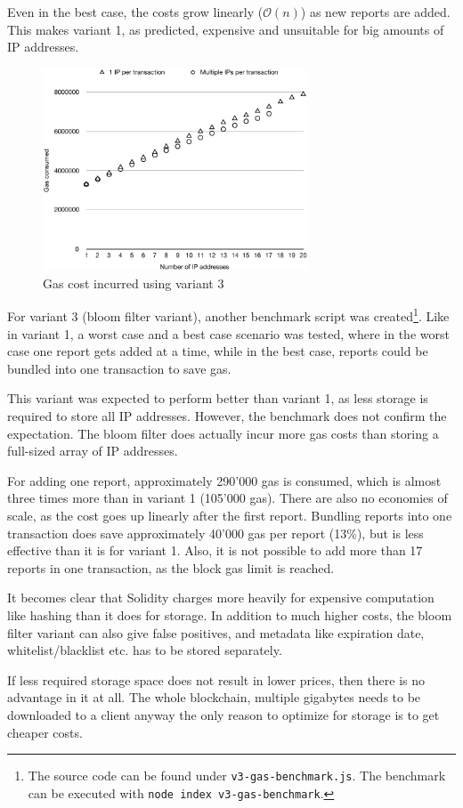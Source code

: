 Even in the best case, the costs grow linearly ($\mathcal{O}(n)$) as new reports are added. This makes variant 1, as predicted, expensive and unsuitable for big amounts of IP addresses.

\begin{figure}[H]
\centering
\includegraphics[width=0.7\textwidth]{v3-gas-cost.pdf}
\caption{Gas cost incurred using variant 3}
\label{fig:v3-gas-cost}
\end{figure}

For variant 3 (bloom filter variant), another benchmark script was created\footnote{The source code can be found under \texttt{v3-gas-benchmark.js}. The benchmark can be executed with \texttt{node index v3-gas-benchmark}.}. Like in variant 1, a worst case and a best case scenario was tested, where in the worst case one report gets added at a time, while in the best case, reports could be bundled into one transaction to save gas.

This variant was expected to perform better than variant 1, as less storage is required to store all IP addresses. However, the benchmark does not confirm the expectation. The bloom filter does actually incur more gas costs than storing a full-sized array of IP addresses. 

For adding one report, approximately 290'000 gas is consumed, which is almost three times more than in variant 1 (105'000 gas). There are also no economies of scale, as the cost goes up linearly after the first report. Bundling reports into one transaction does save approximately 40'000 gas per report (13\%), but is less effective than it is for variant 1. Also, it is not possible to add more than 17 reports in one transaction, as the block gas limit is reached.

It becomes clear that Solidity charges more heavily for expensive computation like hashing than it does for storage.
In addition to much higher costs, the bloom filter variant can also give false positives, and metadata like expiration date, whitelist/blacklist etc. has to be stored separately.

If less required storage space does not result in lower prices, then there is no advantage in it at all. The whole blockchain, multiple gigabytes needs to be downloaded to a client anyway \textemdash {} the only reason to optimize for storage is to get cheaper costs.
